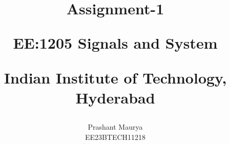 \documentclass[journal,12pt,twocolumn]{IEEEtran}
\theoremstyle{remark}
\begin{document}
%




\vspace{3cm}

\title{
Assignment-1 

\large{EE:1205 Signals and System}

Indian Institute of Technology, Hyderabad
}
\author{Prashant Maurya

EE23BTECH11218
}	


%
%
%

% 
%



% 
\end{document}
